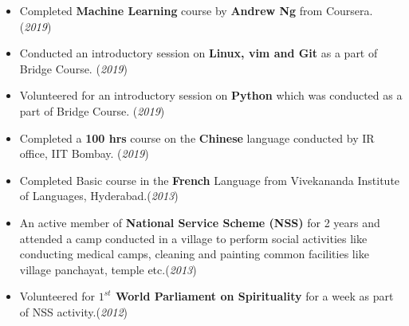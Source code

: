 \documentclass[10pt]{article}
\begin{document}
\colorbox{bl}{}
\vspace{-0.45cm}
\begin{itemize}[leftmargin=0.4cm]
		\item {Completed \textbf{Machine Learning} course by \textbf{Andrew Ng} from Coursera. }\hfill{(\textit{2019})}\vspace{-0.2cm}
	\item {Conducted an introductory session on \textbf{Linux, vim and Git} as a part of Bridge Course. }\hfill{(\textit{2019})}\vspace{-0.2cm}
	\item {Volunteered for an introductory session on \textbf{Python} which was conducted as a part of Bridge Course.}
	\hfill{(\textit{2019})}\vspace{-0.2cm}

    \item {Completed a \textbf{100 hrs} course on the \textbf{Chinese} language conducted by IR office, IIT Bombay. }\hfill{(\textit{2019})}\vspace{-0.2cm}
    \item {Completed Basic course in the \textbf{French} Language from Vivekananda Institute of Languages, Hyderabad.}\hfill{(\textit{2013})}\vspace{-0.2cm}

   \item {An active member of \textbf{National Service Scheme (NSS)} for 2 years and attended a camp conducted in a village to perform social activities like conducting medical camps, cleaning and painting common facilities like village panchayat, temple etc.}\hfill{(\textit{2013})}\vspace{-0.2cm}
   \item {Volunteered for \textbf{$1^{st}$ World Parliament on Spirituality} for a week as part of NSS activity.}\hfill{(\textit{2012})}\vspace{-0.2cm}
    
\end{itemize}

\end{document}
